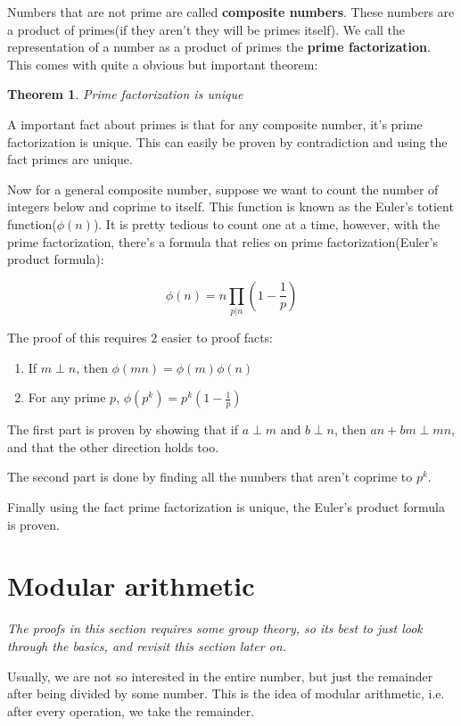 \documentclass{report}
\newtheorem{theorem}{Theorem}[section]
\begin{document}
Numbers that are not prime are called \textbf{composite numbers}. These numbers are a product of primes(if they aren't they will be primes itself). We call the representation of a number as a product of primes the \textbf{prime factorization}. This comes with quite a obvious but important theorem:

\begin{theorem}
	Prime factorization is unique
\end{theorem}

A important fact about primes is that for any composite number, it's prime factorization is unique. This can easily be proven by contradiction and using the fact primes are unique.

Now for a general composite number, suppose we want to count the number of integers below and coprime to itself. This function is known as the Euler's totient function($\phi(n)$). It is pretty tedious to count one at a time, however, with the prime factorization, there's a formula that relies on prime factorization(Euler's product formula):

$$\phi(n)=n\prod_{p|n}\left(1-\frac{1}{p}\right)$$

The proof of this requires $2$ easier to proof facts:
\begin{enumerate}
	\item If $m\perp n$, then $\phi(mn)=\phi(m)\phi(n)$
	\item For any prime $p$, $\phi(p^k)=p^k\left(1-\frac{1}{p}\right)$
\end{enumerate}
The first part is proven by showing that if $a\perp m$ and $b\perp n$, then $an+bm\perp mn$, and that the other direction holds too.

The second part is done by finding all the numbers that aren't coprime to $p^k$.

Finally using the fact prime factorization is unique, the Euler's product formula is proven.
\section{Modular arithmetic}

\emph{The proofs in this section requires some group theory, so its best to just look through the basics, and revisit this section later on.}

Usually, we are not so interested in the entire number, but just the remainder after being divided by some number. This is the idea of modular arithmetic, i.e. after every operation, we take the remainder.
\end{document}
